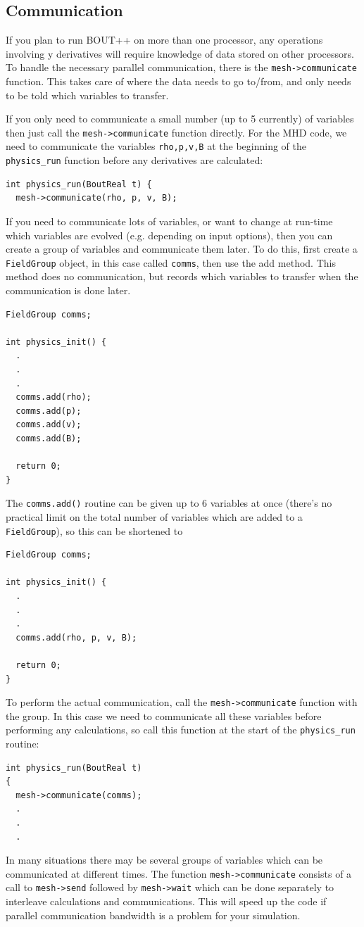 \documentclass[12pt]{article}
\newcommand{\code}[1]{\texttt{#1}}
\begin{document}
\subsection{Communication}
If you plan to run BOUT++ on more than one processor, any operations involving y derivatives
will require knowledge of data stored on other processors. To handle the necessary parallel
communication, there is the \code{mesh->communicate} function. This takes care of where the data
needs to go to/from, and only needs to be told which variables to transfer.

If you only need to communicate a small number (up to 5 currently) of variables then just
call the \code{mesh->communicate} function directly. For the MHD code, we need to communicate
the variables \code{rho,p,v,B} at the beginning of the \code{physics\_run} function
before any derivatives are calculated:
\begin{lstlisting}
int physics_run(BoutReal t) {
  mesh->communicate(rho, p, v, B);
\end{lstlisting}

If you need to communicate lots of variables, or want to change at run-time which
variables are evolved (e.g. depending on input options), then you can create a group
of variables and communicate them later.
To do this, first create a \code{FieldGroup} object, in this case called \code{comms},
then use the add method. This method does no communication, but records which variables to transfer
when the communication is done later.
\begin{lstlisting}
FieldGroup comms;

int physics_init() {
  .
  .
  .
  comms.add(rho);
  comms.add(p);
  comms.add(v);
  comms.add(B);

  return 0;
}
\end{lstlisting}

The \lstinline!comms.add()! routine can be given up to 6 variables at once (there's no practical
limit on the total number of variables which are added to a \lstinline!FieldGroup!), so this can be
shortened to
\begin{lstlisting}
FieldGroup comms;

int physics_init() {
  .
  .
  .
  comms.add(rho, p, v, B);

  return 0;
}
\end{lstlisting}

To perform the actual communication, call the \code{mesh->communicate} function
with the group. In this case
we need to communicate all these variables before performing any calculations, so call
this function at the start of the \code{physics\_run} routine:
\begin{lstlisting}
int physics_run(BoutReal t)
{
  mesh->communicate(comms);
  .
  .
  .
\end{lstlisting}
In many situations there may be several groups of variables which can be communicated at
different times. The function \code{mesh->communicate} consists of a call to \code{mesh->send} followed by \code{mesh->wait}
which can be done separately to interleave calculations and communications. This will speed up the
code if parallel communication bandwidth is a problem for your simulation.
\end{document}
